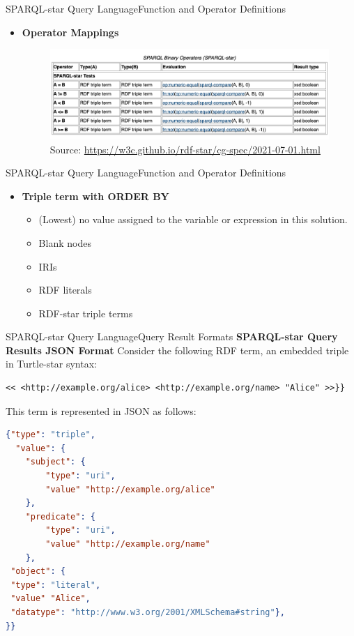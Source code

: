 \documentclass[aspectratio=169]{beamer}
\begin{document}
\begin{frame}{SPARQL-star Query Language}{Function and Operator Definitions}
\begin{itemize}
    \item \textbf{Operator Mappings}
    \begin{figure}
        \centering
        \includegraphics[scale=0.5]{lecture/images/SPARQL Binary Operators (SPARQL-star).png}
        \caption{Source: \url{https://w3c.github.io/rdf-star/cg-spec/2021-07-01.html}}
    \end{figure}
\end{itemize}
\end{frame}

\begin{frame}{SPARQL-star Query Language}{Function and Operator Definitions}
\begin{itemize}
    \item \textbf{Triple term with ORDER BY}
    \begin{itemize}
        \item (Lowest) no value assigned to the variable or expression in this solution.
        \item Blank nodes
        \item IRIs
        \item RDF literals
        \item RDF-star triple terms
    \end{itemize}
\end{itemize}
\end{frame}

\begin{frame}[fragile]{SPARQL-star Query Language}{Query Result Formats}
\textbf{SPARQL-star Query Results JSON Format}
        Consider the following RDF term, an embedded triple in Turtle-star syntax:
\begin{lstlisting}[language=TTL ]
<< <http://example.org/alice> <http://example.org/name> "Alice" >>}}
\end{lstlisting}
        This term is represented in JSON as follows:
\begin{lstlisting}[language=JSON, numbers=none,  basicstyle=\tiny, ]
 {"type": "triple",
  "value": {
    "subject": {
        "type": "uri",
        "value" "http://example.org/alice"
    },
    "predicate": {
        "type": "uri",
        "value" "http://example.org/name"
    },
 "object": {
 "type": "literal",
 "value" "Alice",
 "datatype": "http://www.w3.org/2001/XMLSchema#string"},
}}
\end{lstlisting}
\end{frame}
\end{document}
